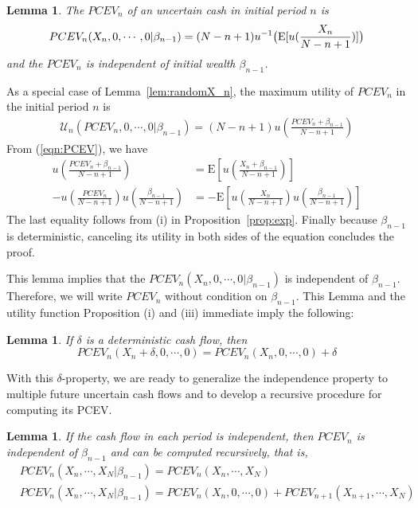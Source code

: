 \documentclass{article}[12pt letter]
\newtheorem{lemma}[theorem]{Lemma}
\newcommand{\E}{\mathrm{E}}
\begin{document}
\begin{lemma} The $PCEV_n$ of an uncertain cash in initial period $n$ is
\begin{align}
PCEV_n(X_n,0,\cdots, 0|\beta_{n-1}) = (N-n+1)u^{-1}\big{(} \E [u(\frac{X_n}{N-n+1})]\big{)}
\end{align}
and the $PCEV_n$ is independent of initial wealth $\beta_{n-1}$.
\end{lemma}
\proof
As a special case of Lemma~\ref{lem:randomX_n}, the maximum utility of  $PCEV_n$ in the initial period $n$ is
\begin{align*} 
    \mathcal{U}_n(PCEV_n, 0,\cdots,0|\beta_{n-1}) = (N-n+1)u(\frac{PCEV_n+\beta_{n-1}}{N-n+1})
\end{align*}
From (\ref{eqn:PCEV}), we have
\begin{align*}
u(\frac{PCEV_n + \beta_{n-1}}{N-n+1})   &=  \E[u(\frac{X_n + \beta_{n-1}}{N-n+1})]\\
-u(\frac{PCEV_n}{N-n+1})u(\frac{\beta_{n-1}}{N-n+1}) &= -\E [u(\frac{X_n}{N-n+1})u(\frac{\beta_{n-1}}{N-n+1})]
\end{align*}
The last equality follows from (i) in Proposition~\ref{prop:exp}.  Finally because $\beta_{n-1}$ is deterministic, canceling its utility in both sides of the equation concludes the proof.
\endproof



This lemma implies that the $PCEV_n(X_n,0,\cdots,0|\beta_{n-1})$ is independent of $\beta_{n-1}$. Therefore, we will write $PCEV_n$ without condition on $\beta_{n-1}$.
This Lemma and the utility function Proposition (i) and (iii) immediate imply the following:
\begin{lemma}\label{lem:delta}
If $\delta$ is a deterministic cash flow, then
\[PCEV_n(X_n+\delta,0,\cdots,0) = PCEV_n(X_n,0,\cdots,0) + \delta\]
\end{lemma}

With this $\delta$-property, we are ready to generalize the independence property to multiple future uncertain cash flows and to develop a recursive procedure for computing its PCEV.

\begin{lemma}\label{lemma:indCF}
If the cash flow in each period is independent, then $PCEV_n$ is independent of $\beta_{n-1}$ and can be computed recursively, that is,
\begin{align}
&PCEV_n(X_n,\cdots,X_N|\beta_{n-1}) = PCEV_n(X_n,\cdots, X_N) \\
&PCEV_n(X_n, \cdots, X_N|\beta_{n-1}) = PCEV_n(X_n, 0, \cdots, 0) + PCEV_{n+1} (X_{n+1}, \cdots, X_N)
\end{align}
\end{lemma}
\end{document}
